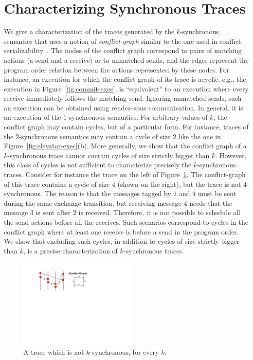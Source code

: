 \section{Characterizing Synchronous Traces}\label{sec:characterizations}

We give a characterization of the traces generated by the $k$-synchronous semantics that uses a notion of \emph{conflict-graph} similar to the one used in conflict serializability~\cite{journals/jacm/Papadimitriou79b}. The nodes of the conflict graph correspond to pairs of matching actions (a send and a receive) or to unmatched sends, and the edges represent the program order relation between the actions represented by these nodes. For instance, an execution for which the conflict graph of its trace is acyclic, e.g., the execution in Figure~\ref{fig:commit-exec}, is ``equivalent'' to an execution where every receive immediately follows the matching send. Ignoring unmatched sends, such an execution can be obtained using rendez-vous communication. In general, it is an execution of the $1$-synchronous semantics. For arbitrary values of $k$, the conflict graph may contain cycles, but of a particular form. For instance, traces of the $2$-synchronous semantics may contain a cycle of size 2 like the one in Figure~\ref{fig:elevator-exec}(b). More generally, we show that the conflict graph of a $k$-synchronous trace cannot contain cycles of size strictly bigger than $k$. However, this class of cycles is not sufficient to characterize precisely the $k$-synchronous traces. Consider for instance the trace on the left of Figure~\ref{fig:ex-rs-cycle}. The conflict-graph of this trace contains a cycle of size $4$ (shown on the right), but the trace is not $4$-synchronous. The reason is that the messages tagged by $1$ and $4$ must be sent during the same exchange transition, but receiving message $4$ needs that the message $3$ is sent after $2$ is received. Therefore, it is not possible to schedule all the send actions before all the receives. Such scenarios correspond to cycles in the conflict graph where at least one receive is before a send in the program order. We show that excluding such cycles, in addition to cycles of size strictly bigger than $k$, is a precise characterization of $k$-synchronous traces.

\begin{figure}[t]
\includegraphics[width=6cm]{ex-rs-cycle.pdf}
\caption{A trace which is not $k$-synchronous, for every $k$.}
\label{fig:ex-rs-cycle}
\end{figure}

